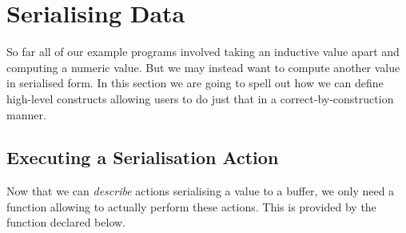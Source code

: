 \section{Serialising Data}\label{sec:serialising}

So far all of our example programs involved taking an inductive value
apart and computing a numeric value.
%
But we may instead want to compute another value in serialised form.
%
In this section we are going to spell out how we can define high-level
constructs allowing users to do just that in a correct-by-construction
manner.






\subsection{Executing a Serialisation Action}

Now that we can \emph{describe} actions serialising a value to
a buffer, we only need a function allowing to actually perform
these actions.
%
This is provided by the  function
declared below.

